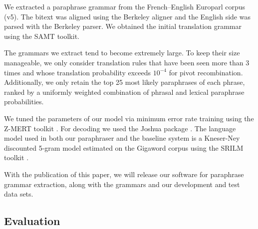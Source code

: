 \documentclass[11pt]{article}
\begin{document}
We extracted a paraphrase grammar from the French--English Europarl
corpus (v5). The bitext was aligned using the Berkeley aligner and the
English side was parsed with the Berkeley parser. We obtained the
initial translation grammar using the SAMT toolkit.

The grammars we extract tend to become extremely large. To keep their
size manageable, we only consider translation rules that have been
seen more than 3 times and whose translation probability exceeds
$10^{-4}$ for pivot recombination. Additionally, we only retain the
top 25 most likely paraphrases of each phrase, ranked by a uniformly
weighted combination of phrasal and lexical paraphrase probabilities.

We tuned the parameters of our model via minimum error rate training
using the Z-MERT toolkit \cite{Zaidan2009}. For decoding we used the
Joshua package \cite{Joshua-WMT}. The language model used in both our
paraphraser and the  baseline system is a
Kneser-Ney discounted 5-gram model estimated on the Gigaword corpus
using the SRILM toolkit \cite{SRILM}.

With the publication of this paper, we will release our software for
paraphrase grammar extraction, along with the grammars and our
development and test data sets.


\subsection{Evaluation} \label{evaluation}
\end{document}
